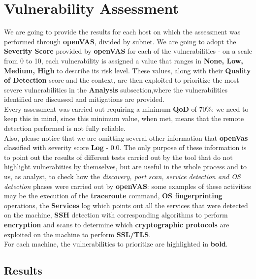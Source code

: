 \section{Vulnerability Assessment}
We are going to provide the results for each host on which the assessment was performed through \textbf{openVAS}, divided by subnet. We are going to adopt the \textbf{Severity Score} provided by \textbf{openVAS} for each of the vulnerabilities - on a scale from 0 to 10, each vulnerability is assigned a value that ranges in \textbf{None, Low, Medium, High} to describe its risk level. These values, along with their \textbf{Quality of Detection} score and the context, are then exploited to prioritize the most severe vulnerabilities in the \textbf{Analysis} subsection,where the vulnerabilities identified are discussed and mitigations are provided.\\
Every assessment was carried out requiring a minimum \textbf{QoD} of 70$\%$: we need to keep this in mind, since this minimum value, when met, means that the remote detection performed is not fully reliable.\\
Also, please notice that we are omitting several other information that \textbf{openVas} classified with severity score \textbf{Log} - 0.0. The only purpose of these information is to point out the results of different tests carried out by the tool that do not highlight vulnerabities by themselves, but are useful in the whole process and to us, as analyst, to check how the \textit{discovery, port scan, service detection and OS detection} phases were carried out by \textbf{openVAS}: some examples of these activities may be the execution of the \textbf{traceroute} command, \textbf{OS fingerprinting} operations, the \textbf{Services} log which points out all the services that were detected on the machine, \textbf{SSH} detection with corresponding algorithms to perform \textbf{encryption} and scans to determine which \textbf{cryptographic protocols} are exploited on the machine to perform \textbf{SSL/TLS}.\\
For each machine, the vulnerabilities to prioritize are highlighted in \textbf{bold}.

\subsection{Results}

